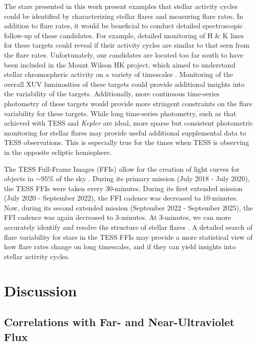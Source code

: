 \documentclass[twocolumn, linenumbers]{aastex631}
\begin{document}
The stars presented in this work present examples that stellar activity cycles could be identified by characterizing stellar flares and measuring flare rates. In addition to flare rates, it would
be beneficial to conduct detailed spectroscopic follow-up of these candidates. For example, detailed monitoring of  H \& K lines for these targets could reveal if their activity cycles
are similar to that seen from the flare rates. Unfortunately, our candidates are located too far south to have been included in the Mount Wilson HK project, which aimed to understand stellar
chromospheric activity on a variety of timescales \citep{Wilson68}. Monitoring of the overall XUV luminosities of these targets could provide additional insights into the variability of the targets.
Additionally, more continuous time-series photometry of these targets would provide more stringent constraints on the flare variability for these targets. While long time-series photometry,
such as that achieved with TESS and \textit{Kepler} are ideal, more sparse but consistent photometric monitoring for stellar flares may provide useful additional supplemental data to TESS observations.
This is especially true for the times when TESS is observing in the opposite ecliptic hemisphere.

The TESS Full-Frame Images (FFIs) allow for the creation of light curves for objects in $\sim 95\%$ of the sky \citep[e.g.][]{feinstein19}. During its primary mission (July 2018 - July 2020),
the TESS FFIs were taken every 30-minutes. During its first extended mission (July 2020 - September 2022), the FFI cadence was decreased to 10-minutes. Now, during its second extended mission
(September 2022 - September 2025), the FFI cadence was again decreased to 3-minutes. At 3-minutes, we can more accurately identify and  resolve the structure of stellar flares \citep{howard22}.
A detailed search of flare variability for stars in the TESS FFIs may provide a more statistical view of how flare rates change on long timescales, and if they can yield insights into stellar
activity cycles.


\section{Discussion}\label{sec:discuss}


\subsection{Correlations with Far- and Near-Ultraviolet Flux}
\end{document}
